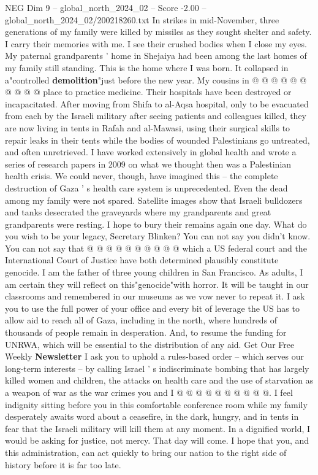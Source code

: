 \begin{textsample}{NEG Dim 9 – global\_north\_2024\_02 – Score -2.00 – global\_north\_2024\_02/200218260.txt}
In strikes in mid-November, three generations of my family were killed by missiles as they sought shelter and safety.
I carry their memories with me.
I see their crushed bodies when I close my eyes.
My paternal grandparents ' home in Shejaiya had been among the last homes of my family still standing.
This is the home where I was born.
It collapsed in a"controlled \textbf{demolition}"just before the new year.
My cousins in @ @ @ @ @ @ @ @ @ @ place to practice medicine.
Their hospitals have been destroyed or incapacitated.
After moving from Shifa to al-Aqsa hospital, only to be evacuated from each by the Israeli military after seeing patients and colleagues killed, they are now living in tents in Rafah and al-Mawasi, using their surgical skills to repair leaks in their tents while the bodies of wounded Palestinians go untreated, and often unretrieved.
I have worked extensively in global health and wrote a series of research papers in 2009 on what we thought then was a Palestinian health crisis.
We could never, though, have imagined this -- the complete destruction of Gaza ' s health care system is unprecedented.
Even the dead among my family were not spared.
Satellite images show that Israeli bulldozers and tanks desecrated the graveyards where my grandparents and great grandparents were resting.
I hope to bury their remains again one day.
What do you wish to be your legacy, Secretary Blinken?
You can not say you didn't know.
You can not say that @ @ @ @ @ @ @ @ @ @ which a US federal court and the International Court of Justice have both determined plausibly constitute genocide.
I am the father of three young children in San Francisco.
As adults, I am certain they will reflect on this"genocide"with horror.
It will be taught in our classrooms and remembered in our museums as we vow never to repeat it.
I ask you to use the full power of your office and every bit of leverage the US has to allow aid to reach all of Gaza, including in the north, where hundreds of thousands of people remain in desperation.
And, to resume the funding for UNRWA, which will be essential to the distribution of any aid.
Get Our Free Weekly \textbf{Newsletter} I ask you to uphold a rules-based order -- which serves our long-term interests -- by calling Israel ' s indiscriminate bombing that has largely killed women and children, the attacks on health care and the use of starvation as a weapon of war as the war crimes you and I @ @ @ @ @ @ @ @ @ @.
I feel indignity sitting before you in this comfortable conference room while my family desperately awaits word about a ceasefire, in the dark, hungry, and in tents in fear that the Israeli military will kill them at any moment.
In a dignified world, I would be asking for justice, not mercy.
That day will come.
I hope that you, and this administration, can act quickly to bring our nation to the right side of history before it is far too late.

\end{textsample}
